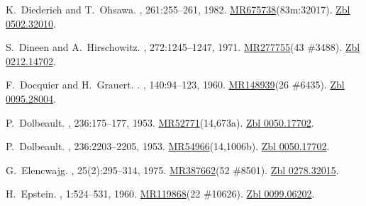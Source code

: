 \documentclass[11pt,a4paper, final, twoside]{article}
\numberwithin{equation}{section}
\begin{document}
\begin{appendices}
\begin{thebibliography}{100}
K.~Diederich and T.~Ohsawa.
, 261:255--261, 1982.
\newblock
  \href{http://www.ams.org/mathscinet-getitem?mr=675738}{MR675738}(83m:32017).
  \href{http://zbmath.org/?q=an:0502.32010}{Zbl 0502.32010}.

S.~Dineen and A.~Hirschowitz.
, 272:1245--1247, 1971.
\newblock \href{http://www.ams.org/mathscinet-getitem?mr=277755}{MR277755}(43
  \#3488). \href{http://zbmath.org/?q=an:0212.14702}{Zbl 0212.14702}.

F.~Docquier and H.~Grauert.
.
, 140:94--123, 1960.
\newblock \href{http://www.ams.org/mathscinet-getitem?mr=148939}{MR148939}(26
  \#6435). \href{http://zbmath.org/?q=an:0095.28004}{Zbl 0095.28004}.

P.~Dolbeault.
, 236:175--177, 1953.
\newblock
  \href{http://www.ams.org/mathscinet-getitem?mr=52771}{MR52771}(14,673a).
  \href{http://zbmath.org/?q=an:0050.17702}{Zbl 0050.17702}.

P.~Dolbeault.
, 236:2203--2205, 1953.
\newblock
  \href{http://www.ams.org/mathscinet-getitem?mr=54966}{MR54966}(14,1006b).
  \href{http://zbmath.org/?q=an:0050.17702}{Zbl 0050.17702}.

G.~Elencwajg.
, 25(2):295--314, 1975.
\newblock \href{http://www.ams.org/mathscinet-getitem?mr=387662}{MR387662}(52
  \#8501). \href{http://zbmath.org/?q=an:0278.32015}{Zbl 0278.32015}.

H.~Epstein.
, 1:524--531, 1960.
\newblock \href{http://www.ams.org/mathscinet-getitem?mr=119868}{MR119868}(22
  \#10626). \href{http://zbmath.org/?q=an:0099.06202}{Zbl 0099.06202}.


\end{thebibliography}
\end{appendices}
\end{document}
